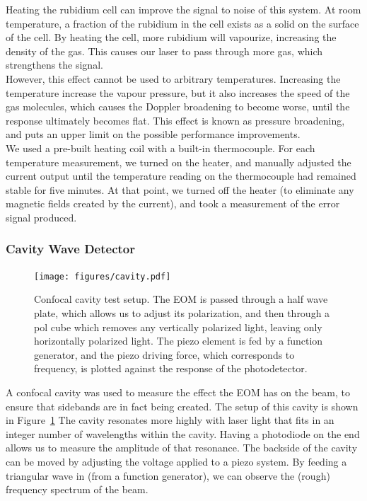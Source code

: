 Heating the rubidium cell can improve the signal to noise of this system.  At room temperature, a fraction of the rubidium in the cell exists as a solid on the surface of the cell.  By heating the cell, more rubidium will vapourize, increasing the density of the gas.  This causes our laser to pass through more gas, which strengthens the signal. \\

However, this effect cannot be used to arbitrary temperatures.  Increasing the temperature increase the vapour pressure, but it also increases the speed of the gas molecules, which causes the Doppler broadening to become worse, until the response ultimately becomes flat.  This effect is known as pressure broadening, and puts an upper limit on the possible performance improvements. \\

We used a pre-built heating coil with a built-in thermocouple.  For each temperature measurement, we turned on the heater, and manually adjusted the current output until the temperature reading on the thermocouple had remained stable for five minutes.  At that point, we turned off the heater (to eliminate any magnetic fields created by the current), and took a measurement of the error signal produced. \\

    \subsubsection{Cavity Wave Detector}

\begin{figure}
  \texttt{[image: figures/cavity.pdf]}
  \caption{Confocal cavity test setup.  The EOM is passed through a half wave plate, which allows us to adjust its polarization, and then through a pol cube which removes any vertically polarized light, leaving only horizontally polarized light.  The piezo element is fed by a function generator, and the piezo driving force, which corresponds to frequency, is plotted against the response of the photodetector.}
  \label{cavity}
\end{figure}

A confocal cavity was used to measure the effect the EOM has on the beam, to ensure that sidebands are in fact being created.  The setup of this cavity is shown in Figure~\ref{cavity}  The cavity resonates more highly with laser light that fits in an integer number of wavelengths within the cavity.  Having a photodiode on the end allows us to measure the amplitude of that resonance.  The backside of the cavity can be moved by adjusting the voltage applied to a piezo system.  By feeding a triangular wave in (from a function generator), we can observe the (rough) frequency spectrum of the beam. \\


